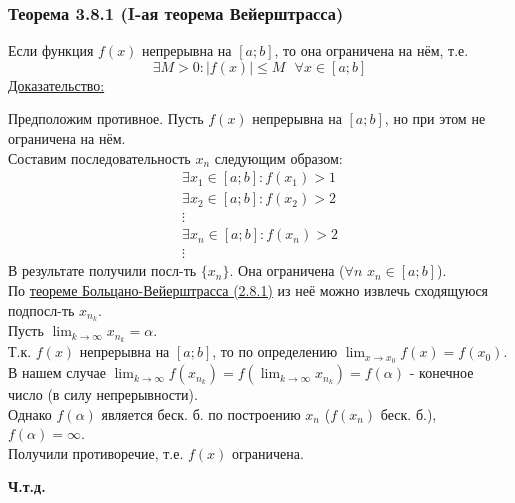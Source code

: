 \documentclass[12pt]{article}
\def\posl#1#2{\{#1_{#2}\}}
\begin{document}
    \subsubsection*{Теорема 3.8.1 (I-ая теорема Вейерштрасса)}\label{th:3.8.1}
    Если функция $f(x)$ непрерывна на $[a; b]$, то она ограничена на нём, т.е.
    \[ \exists M > 0 : \left|f(x)\right| \le M \text{ } \forall x \in [a; b] \]\noindent
    \underline{Доказательство:}
    \begin{adjustwidth}{1.5em}{1.5em}
        Предположим противное. Пусть $f(x)$ непрерывна на $[a; b]$, но при этом не ограничена на нём.\\
        Составим последовательность $x_n$ следующим образом:
            \begin{gather*}
                \exists x_1 \in [a; b] : f(x_1) > 1\\
                \exists x_2 \in [a; b] : f(x_2) > 2\\
                \vdots\\
                \exists x_n \in [a; b] : f(x_n) > 2\\
                \vdots
            \end{gather*}
        В результате получили посл-ть $\posl{x}{n}$. Она ограничена ($\forall n$ $x_n \in [a; b]$).\\
        По \hyperref[th:2.8.1]{теореме Больцано-Вейерштрасса (2.8.1)} из неё можно извлечь сходящуюся подпосл-ть $x_{n_k}$.\\
        Пусть $\lim_{k\to\infty}x_{n_k} = \alpha$.\\
        Т.к. $f(x)$ непрерывна на $[a; b]$, то по определению $\lim_{x\to x_0} f(x) = f(x_0)$.\\
        В нашем случае $\lim_{k\to\infty} f(x_{n_k}) = f(\lim_{k\to\infty}x_{n_{k}}) = f(\alpha)$ - конечное число (в силу непрерывности).\\
        Однако $f(\alpha)$ является беск. б. по построению $x_n$ ($f(x_n)$ беск. б.), $f(\alpha) = \infty$.\\
        Получили противоречие, т.е. $f(x)$ ограничена.
        \begin{center}
            \textbf{Ч.т.д.}
        \end{center} 
    \end{adjustwidth}
\end{document}

